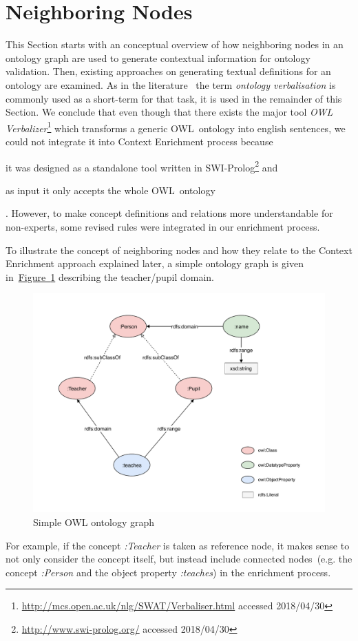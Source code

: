 \documentclass[draft,final]{vutinfth} %
\begin{document}
\section{Neighboring Nodes}\label{sec:neighboring_nodes}
This Section starts with an conceptual overview of how neighboring nodes in an ontology graph are used to generate contextual information for ontology validation. Then, existing approaches on generating textual definitions for an ontology are examined. As in the literature~\cite{soton265735} the term \textit{ontology verbalisation} is commonly used as a short-term for that task, it is used in the remainder of this Section. We conclude that even though that there exists the major tool \textit{OWL Verbalizer}\footnote{\url{http://mcs.open.ac.uk/nlg/SWAT/Verbaliser.html} accessed 2018/04/30} which transforms a generic OWL~ontology into english sentences, we could not integrate it into Context Enrichment process because 
\begin{inparaenum}[a)]
		\item it was designed as a standalone tool written in SWI-Prolog\footnote{\url{http://www.swi-prolog.org/} accessed 2018/04/30} and
		\item as input it only accepts the whole OWL~ontology 
\end{inparaenum}.
However, to make concept definitions and relations more understandable for non-experts, some revised rules were integrated in our enrichment process.

To illustrate the concept of neighboring nodes and how they relate to the Context Enrichment approach explained later, a simple ontology graph is given in~\hyperref[fig:simple_owl_graph]{Figure~\ref*{fig:simple_owl_graph}} describing the teacher/pupil domain.
\begin{figure}
	 \centering
	 \includegraphics[width=\textwidth]{drawio/University_Ontology_Example}
	 \caption{Simple OWL ontology graph}\label{fig:simple_owl_graph}
\end{figure}
For example, if the concept \textit{:Teacher} is taken as reference node, it makes sense to not only consider the concept itself, but instead include connected nodes~(e.g. the concept \textit{:Person} and the object property \textit{:teaches}) in the enrichment process. 
\end{document}
